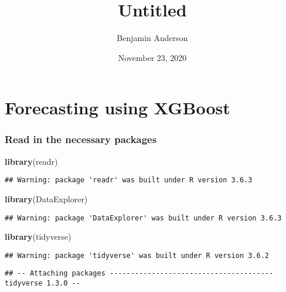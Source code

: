 \documentclass[]{article}
\title{Untitled}
\author{Benjamin Anderson}
\date{November 23, 2020}
\newenvironment{Shaded}{\begin{snugshade}}{\end{snugshade}}
\newcommand{\KeywordTok}[1]{\textcolor[rgb]{0.13,0.29,0.53}{\textbf{#1}}}
\newcommand{\NormalTok}[1]{#1}
\begin{document}
\maketitle

\hypertarget{forecasting-using-xgboost}{%
\section{Forecasting using XGBoost}\label{forecasting-using-xgboost}}

\hypertarget{read-in-the-necessary-packages}{%
\subsubsection{Read in the necessary
packages}\label{read-in-the-necessary-packages}}

\begin{Shaded}
\begin{Highlighting}[]
\KeywordTok{library}\NormalTok{(readr)}
\end{Highlighting}
\end{Shaded}

\begin{verbatim}
## Warning: package 'readr' was built under R version 3.6.3
\end{verbatim}

\begin{Shaded}
\begin{Highlighting}[]
\KeywordTok{library}\NormalTok{(DataExplorer)}
\end{Highlighting}
\end{Shaded}

\begin{verbatim}
## Warning: package 'DataExplorer' was built under R version 3.6.3
\end{verbatim}

\begin{Shaded}
\begin{Highlighting}[]
\KeywordTok{library}\NormalTok{(tidyverse)}
\end{Highlighting}
\end{Shaded}

\begin{verbatim}
## Warning: package 'tidyverse' was built under R version 3.6.2
\end{verbatim}

\begin{verbatim}
## -- Attaching packages --------------------------------------- tidyverse 1.3.0 --
\end{verbatim}
\end{document}
